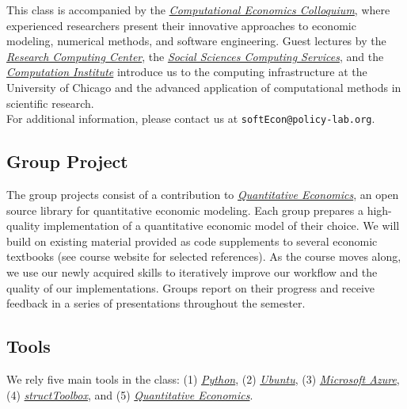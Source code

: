 %
\noindent This class is accompanied by the \href{http://bfi.uchicago.edu/events/computational-economics-colloquium}{\textit{Computational Economics Colloquium}}, where experienced researchers present their innovative approaches to economic modeling, numerical methods, and software engineering. Guest lectures by the \href{https://rcc.uchicago.edu}{\textit{Research Computing Center}}, the \href{https://sscs.uchicago.edu}{\textit{Social Sciences Computing Services}}, and the  \href{https://www.ci.uchicago.edu/}{\textit{Computation Institute}} introduce us to the computing infrastructure at the University of Chicago and the advanced application of computational methods in scientific research.\\\newline
%
\noindent For additional information, please contact us at \verb+softEcon@policy-lab.org+.
\subsection*{Group Project}\vspace{0.5cm}
The group projects consist of a contribution to \href{http://quant-econ.net}{\textit{Quantitative Economics}}, an open source library for quantitative economic modeling. Each group prepares a high-quality implementation of a quantitative economic model of their choice. We will build on existing material provided as code supplements to several economic textbooks (see course website for selected references). As the course moves along, we use our newly acquired skills to iteratively improve our workflow and the quality of our implementations. Groups report on their progress and receive feedback in a series of presentations throughout the semester.
\subsection*{Tools}\vspace{0.5cm}
\noindent We rely five main tools in the class: (1) \href{https://www.python.org/}{\textit{Python}}, (2) \href{http://www.ubuntu.com/}{\textit{Ubuntu}}, (3) \href{http://www.azure.microsoft.com/en-us/}{\textit{Microsoft Azure}}, (4) \href{http://policy-lab.org/structToolbox/}{\textit{structToolbox}}, and (5) \href{http://quant-econ.net}{\textit{Quantitative Economics}}.


